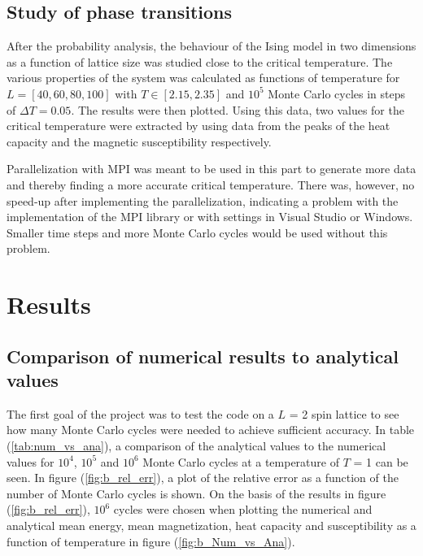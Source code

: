 \documentclass[10pt,a4paper,titlepage]{article}
\begin{document}
\subsection{Study of phase transitions}
After the probability analysis, the behaviour of the Ising model in two dimensions as a function of lattice size was studied close to the critical temperature. The various properties of the system was calculated as functions of temperature for $L=[40,60,80,100]$ with $T\in[2.15,2.35]$ and $10^5$ Monte Carlo cycles in steps of $\Delta T = 0.05$. The results were then plotted. Using this data, two values for the critical temperature were extracted by using data from the peaks of the heat capacity and the magnetic susceptibility respectively. 

Parallelization with MPI was meant to be used in this part to generate more data and thereby finding a more accurate critical temperature. There was, however, no speed-up after implementing the parallelization, indicating a problem with the implementation of the MPI library or with settings in Visual Studio or Windows. Smaller time steps and more Monte Carlo cycles would be used without this problem. 


\section{Results}
\subsection{Comparison of numerical results to analytical values}
The first goal of the project was to test the code on a $L$ = 2 spin lattice to see how many Monte Carlo cycles were needed to achieve sufficient accuracy.
	In table (\ref{tab:num_vs_ana}), a comparison of the analytical values to the numerical values for $10^4$, $10^5$ and $10^6$ Monte Carlo cycles at a temperature of $T$ = 1 can be seen. 
	In figure (\ref{fig:b_rel_err}), a plot of the relative error as a function of the number of Monte Carlo cycles is shown. 
	On the basis of the results in figure (\ref{fig:b_rel_err}), $10^6$ cycles were chosen when plotting the numerical and analytical mean energy, mean magnetization, heat capacity and susceptibility as a function of temperature in figure (\ref{fig:b_Num_vs_Ana}). 
	
\end{document}
